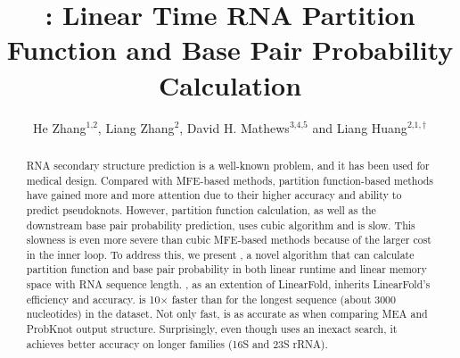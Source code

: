 \documentclass{ws-procs11x85}
\begin{document}

\title{{\bf{\linearpartition}}: Linear Time RNA Partition Function and Base Pair Probability Calculation}

\author{He Zhang$^{\text{1,2}}$, Liang Zhang$^{\text{2}}$, David H. Mathews$^{\text{3,4,5}}$ and Liang Huang$^{\text{2,1},\dag}$}

\address{$^{\text{1}}$Baidu Research USA, Sunnyvale, CA 94089, USA,
$^{\text{2}}$School of Electrical Engineering and Computer Science, Oregon State University, Corvallis, OR 97330, USA, 
$^{\text{3}}$Department of Biochemistry ~\& Biophysics,
$^{\text{4}}$Center for RNA Biology,
and $^{\text{5}}$Department of Biostatistics ~\& Computational Biology, University of Rochester Medical Center, Rochester, NY 48306, USA
$^\dag$E-mail: liang.huang.sh@gmail.com}



\begin{abstract}
RNA secondary structure prediction is a well-known problem, and it has been used for medical design. 
Compared with MFE-based methods, partition function-based methods have gained more and more attention due to their higher accuracy and ability to predict pseudoknots.
However, partition function calculation, as well as the downstream base pair probability prediction, uses cubic algorithm and is slow. This slowness is even more severe than cubic MFE-based methods because of the larger cost in the inner loop. 
To address this, we present \linearpartition, a novel algorithm that can calculate partition function and base pair probability in both linear runtime and linear memory space with RNA sequence length.
\linearpartition, as an extention of LinearFold, inherits LinearFold's efficiency and accuracy. \linearpartition is 10$\times$ faster than \viennarnafold for the longest sequence (about 3000 nucleotides) in the dataset. Not only fast, \linearpartition is as accurate as \viennarnafold when comparing MEA and ProbKnot output structure. 
Surprisingly, even though \linearpartition uses an inexact search, it achieves better accuracy on longer families (16S and 23S rRNA).

\end{abstract}
\end{document}
